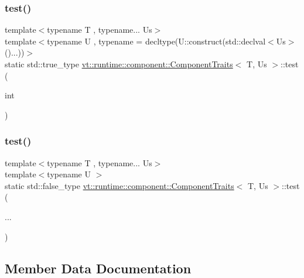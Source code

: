 \subsubsection{\texorpdfstring{test()}{test()}\hspace{0.1cm}{\footnotesize\ttfamily [1/2]}}
{\footnotesize\ttfamily template$<$typename T , typename... Us$>$ \\
template$<$typename U , typename  = decltype(\+U\+::construct(std\+::declval$<$\+Us$>$()...))$>$ \\
static std\+::true\+\_\+type \hyperlink{structvt_1_1runtime_1_1component_1_1_component_traits}{vt\+::runtime\+::component\+::\+Component\+Traits}$<$ T, Us $>$\+::test (\begin{DoxyParamCaption}\item[{int}]{ }\end{DoxyParamCaption})\hspace{0.3cm}{\ttfamily [static]}}

\mbox{\label{structvt_1_1runtime_1_1component_1_1_component_traits_addeae37e194545ea033a64a61ff646c9}} 
\subsubsection{\texorpdfstring{test()}{test()}\hspace{0.1cm}{\footnotesize\ttfamily [2/2]}}
{\footnotesize\ttfamily template$<$typename T , typename... Us$>$ \\
template$<$typename U $>$ \\
static std\+::false\+\_\+type \hyperlink{structvt_1_1runtime_1_1component_1_1_component_traits}{vt\+::runtime\+::component\+::\+Component\+Traits}$<$ T, Us $>$\+::test (\begin{DoxyParamCaption}\item[{}]{... }\end{DoxyParamCaption})\hspace{0.3cm}{\ttfamily [static]}}



\subsection{Member Data Documentation}
\mbox{\label{structvt_1_1runtime_1_1component_1_1_component_traits_af0ab616ad3c6a062e23aac0332cb6e69}} 
